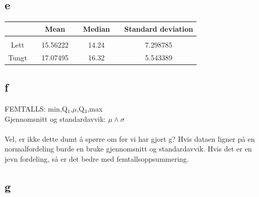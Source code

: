 \subsection*{e}

\begin{center}
\label{tab:mean_median_standard}
\begin{tabularx}{\textwidth}{c X c X c X c }
    \hline
    \hline
         && Mean && Median && Standard deviation \\
    \hline
    \\
        Lett   	&&     15.56222      &&      14.24      &&     7.298785       \\
        Tungt   &&     17.07495      &&      16.32      &&      5.543389       \\
    \hline
\end{tabularx}
\end{center}


\subsection*{f}

FEMTALLS: min,Q$_1$,$\mu$,Q$_3$,max
\\
Gjennomsnitt og standardavvik: $\mu \land \sigma$
\\
\\
Vel, er ikke dette dumt å spørre om før vi har gjort g? Hvis dataen ligner på en normalfordeling burde en bruke gjennomsnitt og standardavvik. Hvis det er en jevn fordeling, så er det bedre med femtallsoppsummering. 

\subsection*{g}


